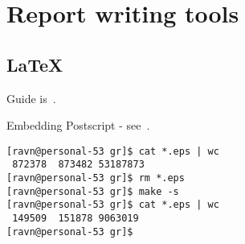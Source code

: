 \section{Report writing tools}

\subsection{\LaTeX}

Guide is~\cite{a-guide-to-latex}.

Embedding Postscript - see~\cite{the-latex-graphics-companion}.
\begin{verbatim}
[ravn@personal-53 gr]$ cat *.eps | wc
 872378  873482 53187873
[ravn@personal-53 gr]$ rm *.eps
[ravn@personal-53 gr]$ make -s
[ravn@personal-53 gr]$ cat *.eps | wc
 149509  151878 9063019
[ravn@personal-53 gr]$
\end{verbatim}

